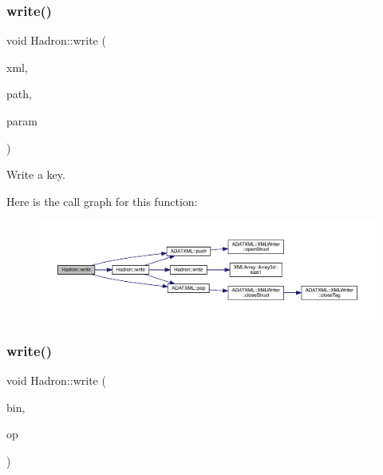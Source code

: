 \subsubsection{\texorpdfstring{write()}{write()}\hspace{0.1cm}{\footnotesize\ttfamily [87/95]}}
{\footnotesize\ttfamily void Hadron\+::write (\begin{DoxyParamCaption}\item[{\mbox{\hyperlink{classADATXML_1_1XMLWriter}{X\+M\+L\+Writer}} \&}]{xml,  }\item[{const std\+::string \&}]{path,  }\item[{const \mbox{\hyperlink{structHadron_1_1SingleHadronQuarkDeriv__t}{Single\+Hadron\+Quark\+Deriv\+\_\+t}} \&}]{param }\end{DoxyParamCaption})}



Write a key. 

Here is the call graph for this function\+:
\nopagebreak
\begin{figure}[H]
\begin{center}
\leavevmode
\includegraphics[width=350pt]{d1/daf/namespaceHadron_a2e0c9a892aa8790addf90c28db1eaf28_cgraph}
\end{center}
\end{figure}
\mbox{\label{namespaceHadron_aca06b6220f81ed284c829138c237b84e}} 
\subsubsection{\texorpdfstring{write()}{write()}\hspace{0.1cm}{\footnotesize\ttfamily [88/95]}}
{\footnotesize\ttfamily void Hadron\+::write (\begin{DoxyParamCaption}\item[{\mbox{\hyperlink{classADATIO_1_1BinaryWriter}{Binary\+Writer}} \&}]{bin,  }\item[{const \mbox{\hyperlink{structHadron_1_1SingleHadronQuarkDeriv__t}{Single\+Hadron\+Quark\+Deriv\+\_\+t}} \&}]{op }\end{DoxyParamCaption})}



